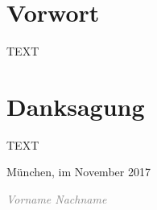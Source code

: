 \cleardoublepage
\thispagestyle{plain}
%
\section*{Vorwort}
TEXT

\section*{Danksagung}
TEXT

\vspace*{0.8cm}
München, im November 2017
\vspace*{-0.3cm}
\begin{figure}[H]{
\vspace*{-0.7cm}
}\end{figure}
\hspace*{-0.1cm}
\textcolor{gray}{\textit{Vorname Nachname}}
\clearpage

\newpage
\thispagestyle{empty}
\clearpage